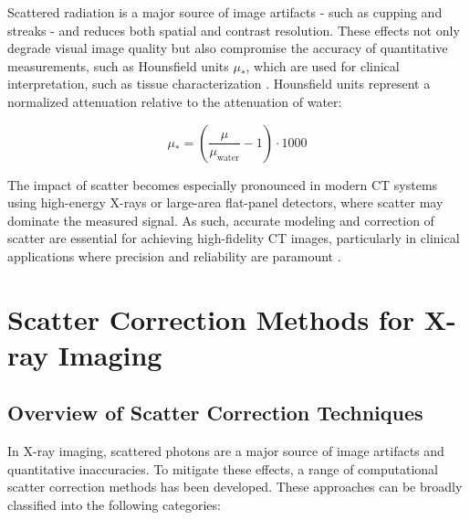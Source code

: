 Scattered radiation is a major source of image artifacts - such as cupping and
streaks - and reduces both spatial and contrast resolution. These effects not
only degrade visual image quality but also compromise the accuracy of
quantitative measurements, such as Hounsfield units $\mu_*$, which are used for
clinical interpretation, such as tissue characterization
\cite[Chap.~8]{medicalImagingSystemsIntro2019:}. Hounsfield units represent a
normalized attenuation relative to the attenuation of water:

\begin{equation}
    \mu_* = \left(\frac{\mu}{\mu_{\text{water}}} -1\right) \cdot 1000
\end{equation}

The impact of scatter becomes especially pronounced in modern CT systems using
high-energy X-rays or large-area flat-panel detectors, where scatter may
dominate the measured signal. As such, accurate modeling and correction of
scatter are essential for achieving high-fidelity CT images, particularly in
clinical applications where precision and reliability are paramount
\citep{medicalImagingSystemsIntro2019:}.


\section{Scatter Correction Methods for X-ray Imaging}

\subsection{Overview of Scatter Correction Techniques}

In X-ray imaging, scattered photons are a major source of image artifacts and
quantitative inaccuracies. To mitigate these effects, a range of computational
scatter correction methods has been developed. These approaches can be broadly
classified into the following categories:

